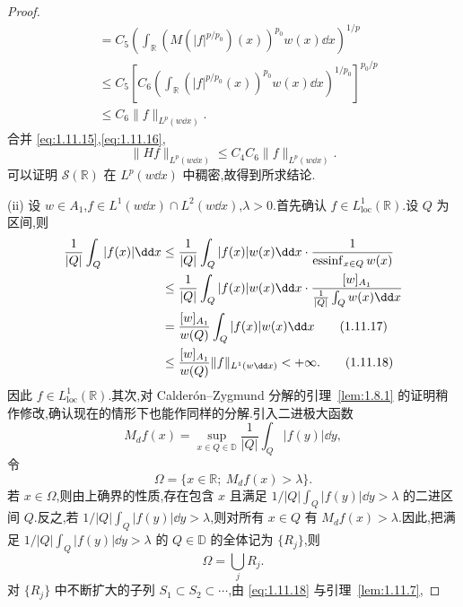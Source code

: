 \begin{proof}
\begin{equation}
\begin{aligned}
& = C_{5}\left(\displaystyle\int_{\mathbb{R}}\left(M(|f|^{p/p_{0}})(x)\right)^{p_{0}}w(x)\dd x\right)^{1/p} \\
& \leq C_{5}\left[C_{6}\left(\displaystyle\int_{\mathbb{R}}\left(|f|^{p/p_{0}}(x)\right)^{p_{0}}w(x)\dd x\right)^{1/p_{0}}\right]^{p_{0}/p} \\
& \leq C_{6}\| f \|_{L^{p}(w\dd x)}.
\end{aligned}\label{eq:1.11.16}\end{equation}
合并 \eqref{eq:1.11.15},\eqref{eq:1.11.16},
\begin{equation*}
\| Hf \|_{L^{p}(w\dd x)} \leq C_{4}C_{6}\| f \|_{L^{p}(w\dd x)}.
\end{equation*}
可以证明 $\mathcal{S}(\mathbb{R})$ 在 $L^{p}(w\dd x)$ 中稠密,故得到所求结论.

(ii) 设 $w \in A_{1}$,$f \in L^{1}(w\dd x) \cap L^{2}(w\dd x)$,$\lambda > 0$.首先确认 $f \in L_{\mathrm{loc}}^{1}(\mathbb{R})$.设 $Q$ 为区间,则
\begin{align}
\frac{1}{|Q|}\int_{Q}|f(x)|\dd x &\leq \frac{1}{|Q|}\int_{Q}|f(x)|w(x)\dd x\cdot\frac{1}{\operatorname{essinf}_{x \in Q}w(x)} \notag \\
&\leq \frac{1}{|Q|}\int_{Q}|f(x)|w(x)\dd x\cdot\frac{[w]_{A_{1}}}{\frac{1}{|Q|}\int_{Q}w(x)\dd x} \notag \\
&= \frac{[w]_{A_{1}}}{w(Q)}\int_{Q}|f(x)|w(x)\dd x \tag{1.11.17}\label{eq:1.11.17} \\
&\leq \frac{[w]_{A_{1}}}{w(Q)}\| f \|_{L^{1}(w\dd x)} < +\infty. \tag{1.11.18}\label{eq:1.11.18}
\end{align}
因此 $f \in L_{\mathrm{loc}}^{1}(\mathbb{R})$.其次,对 Calderón--Zygmund 分解的引理~\ref{lem:1.8.1} 的证明稍作修改,确认现在的情形下也能作同样的分解.引入二进极大函数
\begin{equation*}
M_{d}f(x) = \sup_{x \in Q \in \mathbb{D}}\frac{1}{|Q|}\int_{Q}|f(y)|\dd y,
\end{equation*}
令
\begin{equation*}
\Omega = \{x \in \mathbb{R};\ M_{d}f(x) > \lambda\}.
\end{equation*}
若 $x \in \Omega$,则由上确界的性质,存在包含 $x$ 且满足 $1/|Q|\int_{Q}|f(y)|\dd y > \lambda$ 的二进区间 $Q$.反之,若 $1/|Q|\int_{Q}|f(y)|\dd y > \lambda$,则对所有 $x \in Q$ 有 $M_{d}f(x) > \lambda$.因此,把满足 $1/|Q|\int_{Q}|f(y)|\dd y > \lambda$ 的 $Q \in \mathbb{D}$ 的全体记为 $\{R_{j}\}$,则
\begin{equation*}
\Omega = \bigcup_{j}R_{j}.
\end{equation*}
对 $\{R_{j}\}$ 中不断扩大的子列 $S_{1} \subset S_{2} \subset \cdots$,由 \eqref{eq:1.11.18} 与引理~\ref{lem:1.11.7},

\end{proof}
